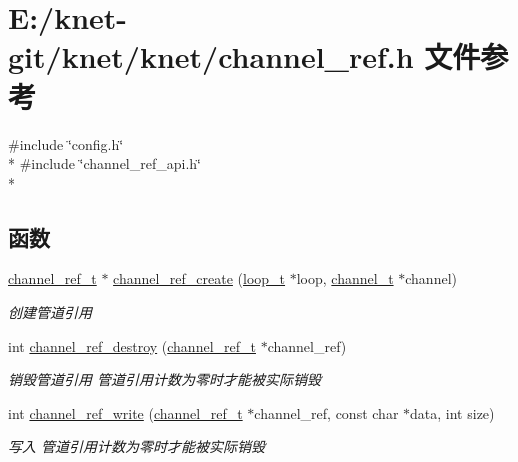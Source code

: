 \hypertarget{a00049}{}\section{E\+:/knet-\/git/knet/knet/channel\+\_\+ref.h 文件参考}
\label{a00049}
{\ttfamily \#include \char`\"{}config.\+h\char`\"{}}\\*
{\ttfamily \#include \char`\"{}channel\+\_\+ref\+\_\+api.\+h\char`\"{}}\\*
\subsection*{函数}
\begin{DoxyCompactItemize}
\item 
\hyperlink{a00051_a151271c9d188ef28d4d24bb81dcc1263_a151271c9d188ef28d4d24bb81dcc1263}{channel\+\_\+ref\+\_\+t} $\ast$ \hyperlink{a00049_a82a1514a1b492ad693c7cb28606a5d01_a82a1514a1b492ad693c7cb28606a5d01}{channel\+\_\+ref\+\_\+create} (\hyperlink{a00051_a9c3ad1cd2de83e09f3a7b59fa82c94ee_a9c3ad1cd2de83e09f3a7b59fa82c94ee}{loop\+\_\+t} $\ast$loop, \hyperlink{a00051_a2effb3e20d0b7e5f6d5ac42118e0330b_a2effb3e20d0b7e5f6d5ac42118e0330b}{channel\+\_\+t} $\ast$channel)
\begin{DoxyCompactList}\small\item\em 创建管道引用 \end{DoxyCompactList}\item 
int \hyperlink{a00049_a8c61b880489dcb1a556e3458e748d9f7_a8c61b880489dcb1a556e3458e748d9f7}{channel\+\_\+ref\+\_\+destroy} (\hyperlink{a00051_a151271c9d188ef28d4d24bb81dcc1263_a151271c9d188ef28d4d24bb81dcc1263}{channel\+\_\+ref\+\_\+t} $\ast$channel\+\_\+ref)
\begin{DoxyCompactList}\small\item\em 销毁管道引用 管道引用计数为零时才能被实际销毁 \end{DoxyCompactList}\item 
int \hyperlink{a00049_a0688f00d64ff34ae18fd4a354d890029_a0688f00d64ff34ae18fd4a354d890029}{channel\+\_\+ref\+\_\+write} (\hyperlink{a00051_a151271c9d188ef28d4d24bb81dcc1263_a151271c9d188ef28d4d24bb81dcc1263}{channel\+\_\+ref\+\_\+t} $\ast$channel\+\_\+ref, const char $\ast$data, int size)
\begin{DoxyCompactList}\small\item\em 写入 管道引用计数为零时才能被实际销毁 \end{DoxyCompactList}\item 

\end{DoxyCompactItemize}
